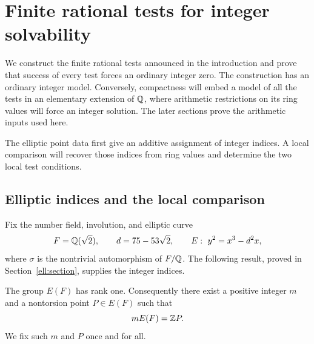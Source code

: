 \section{Finite rational tests for integer solvability}
\label{sec:reduction}

We construct the finite rational tests announced in the introduction and
prove that success of every test forces an ordinary integer zero.  The
construction has an ordinary integer model.  Conversely, compactness will
embed a model of all the tests in an elementary extension of \(\mathbb Q\),
where arithmetic restrictions on its ring values will force an integer
solution.  The later sections prove the arithmetic inputs used here.

The elliptic point data first give an additive assignment of integer
indices.  A local comparison will recover those indices from ring values
and determine the two local test conditions.

\subsection{Elliptic indices and the local comparison}
\label{red:local-comparison-section}

Fix the number field, involution, and elliptic curve
\begin{equation}\label{ell:data}
 F=\mathbb Q(\sqrt2),\qquad d=75-53\sqrt2,\qquad
 E:\ y^2=x^3-d^2x,
\end{equation}
where \(\sigma\) is the nontrivial automorphism of \(F/\mathbb Q\).
The following result, proved in Section~\ref{ell:section}, supplies the
integer indices.

\begin{proposition}\label{ell:rank}
The group $E(F)$ has rank one.  Consequently there exist a positive integer
$m$ and a nontorsion point $P\in E(F)$ such that
\[
                         mE(F)=\mathbb Z P.
\]
We fix such $m$ and $P$ once and for all.
\end{proposition}


